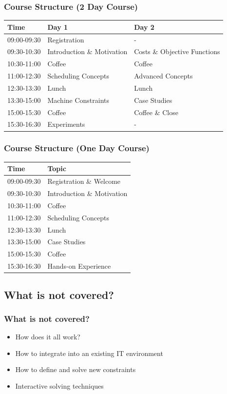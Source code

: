 \begin{frame}
\frametitle{Course Structure (2 Day Course)}
\begin{tabular}{lp{4cm}p{4cm}}\toprule
Time & Day 1 & Day 2\\\midrule
09:00-09:30 & Registration & - \\
09:30-10:30 & Introduction \& Motivation & Costs \& Objective Functions\\
10:30-11:00 & Coffee & Coffee \\
11:00-12:30 & Scheduling Concepts& Advanced Concepts\\
12:30-13:30 & Lunch & Lunch \\
13:30-15:00 & Machine Constraints & Case Studies\\
15:00-15:30 & Coffee & Coffee \& Close\\
15:30-16:30 & Experiments & -\\
\bottomrule
\end{tabular}
\end{frame}

\begin{frame}
\frametitle{Course Structure (One Day Course)}
\begin{tabular}{lp{9cm}}\toprule
Time & Topic \\\midrule
09:00-09:30 & Registration \& Welcome \\
09:30-10:30 & Introduction \& Motivation\\
10:30-11:00 & Coffee \\
11:00-12:30 & Scheduling Concepts\\
12:30-13:30 & Lunch\\
13:30-15:00 & Case Studies\\
15:00-15:30 & Coffee \\
15:30-16:30 & Hands-on Experience\\
\bottomrule
\end{tabular}
\end{frame}


\subsection{What is not covered?}

\begin{frame}
\frametitle{What is not covered?}
\begin{itemize}
\item How does it all work?
\item How to integrate into an existing IT environment
\item How to define and solve new constraints
\item Interactive solving techniques 
\end{itemize}
\end{frame}

